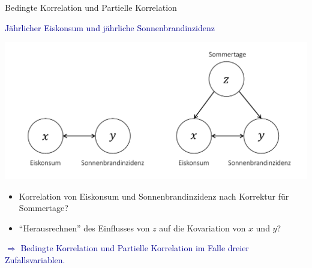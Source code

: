 \documentclass[
  8pt,
  ignorenonframetext,
]{beamer}
\providecommand{\tightlist}{%
  \setlength{\itemsep}{0pt}\setlength{\parskip}{0pt}}
\begin{document}
\begin{frame}{Bedingte Korrelation und Partielle Korrelation}
\protect\hypertarget{bedingte-korrelation-und-partielle-korrelation-1}{}
\center

\textcolor{darkblue}{Jährlicher Eiskonsum und jährliche Sonnenbrandinzidenz}
\vspace{2mm}

\begin{center}\includegraphics[width=0.8\linewidth]{2_Abbildungen/alm_2_eis_sonnenbrand_sommer} \end{center}

\small

\begin{itemize}
\tightlist
\item
  Korrelation von Eiskonsum und Sonnenbrandinzidenz nach Korrektur für
  Sommertage?
\item
  ``Herausrechnen'' des Einflusses von \(z\) auf die Kovariation von
  \(x\) und \(y\)?
\end{itemize}

\center
\normalsize

\textcolor{darkblue}{$\Rightarrow$ Bedingte Korrelation und Partielle Korrelation im Falle dreier Zufallsvariablen.}
\end{frame}
\end{document}

